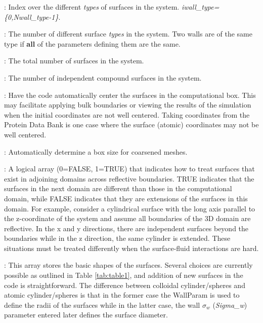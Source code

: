 \documentclass[10pt,onecolumn]{article}
\begin{document}
\vspace{0.1in}
: Index over the different {\it types}
of surfaces in the system. {\it iwall\_type=\{0,Nwall\_type-1\}}.

\vspace{0.1in}
:  The number of different surface {\it
types} in the system.  Two walls are of the same type if {\bf all}
of the parameters defining them are the same.

\vspace{0.1in}
: The total number of surfaces in the system.

\vspace{0.1in}
: The number of independent compound surfaces
in the system.

\vspace{0.1in}
:  Have the code automatically center the
surfaces in the computational box.  This may facilitate applying bulk
boundaries or viewing the results of the simulation when the initial
coordinates are not well centered.  Taking coordinates from the Protein
Data Bank is one case where the surface (atomic) coordinates may not
be well centered.

\vspace{0.1in}
:  Automatically determine a box size for coarsened meshes. 

\vspace{0.1in}
: A logical array (0=FALSE,
1=TRUE) that indicates how to treat surfaces that exist in
adjoining domains across reflective boundaries.  TRUE indicates
that the surfaces in the next domain are different than those
in the computational domain, while FALSE indicates that they
are extensions of the surfaces in this domain.  For example,
consider a cylindrical surface with the long axis parallel to the
z-coordinate of the system and assume all boundaries of the 3D
domain are reflective.  In the x and y directions, there are
independent surfaces beyond the boundaries while in the z
direction, the same cylinder is extended.  These situations
must be treated differently when the surface-fluid interactions
are hard.
%

\vspace{0.1in}
:  This array stores the basic shapes of the surfaces.
Several choices are currently possible as outlined in Table \ref{tab:table1},
and addition of new surfaces in the
code is straightforward.  The difference between colloidal
cylinder/spheres and atomic cylinder/spheres is that in
the former case the WallParam is used to define the radii of the
surfaces while in the latter case, the wall $\sigma_w$ ({\it Sigma\_w})
parameter entered later defines the surface diameter.
\end{document}
